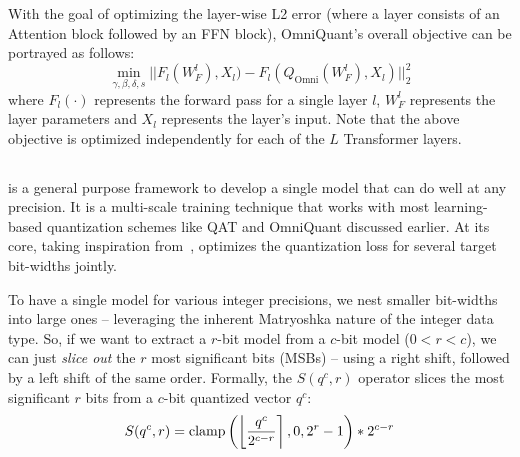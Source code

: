 With the goal of optimizing the layer-wise L2 error (where a layer consists of an Attention block followed by an FFN block), OmniQuant's overall objective can be portrayed
 as follows:
\begin{equation}
    \label{omni_obj}
    \min_{\gamma,\beta,\delta,s} ||F_{l}(W_F^l), X_{l}) - F_{l}(Q_{\text{Omni}}(W_F^l), X_{l})||^2_{2}
\end{equation}
where $F_{l}(\cdot)$ represents the forward pass for a single layer $l$, $W_F^l$ represents the layer parameters and $X_{l}$ represents the layer's input. Note that the above objective is optimized independently for each of the $L$ Transformer layers.

\vspace{-2mm}
\subsection{\alg}
\label{sec:matquant}
\alg is a general purpose framework to develop a single model that can do well at any precision. It is a multi-scale training technique that works with most learning-based quantization schemes like QAT and OmniQuant discussed earlier. At its core, taking inspiration from~\citet{kusupati2022matryoshka}, \alg optimizes the quantization loss for several target bit-widths jointly. 

To have a single model for various integer precisions, we nest smaller bit-widths into large ones -- leveraging the inherent Matryoshka nature of the integer data type. So, if we want to extract a $r$-bit model from a $c$-bit model ($0<r<c$), we can just \textit{slice out} the $r$ most significant bits (MSBs) -- using a right shift, followed by a left shift of the same order. Formally, the $S(q^c, r)$ operator slices the most significant $r$ bits from a $c$-bit quantized vector $q^c$:
\begin{equation}
\label{eqn:slicing}
   S(q^c, r) = \text{clamp}\left(\left\lfloor \frac{q^c}{2^{c - r}} \right\rceil, 0, 2^r - 1  \right)  * 2^{c - r}
   \vspace{-3mm}
\end{equation}

